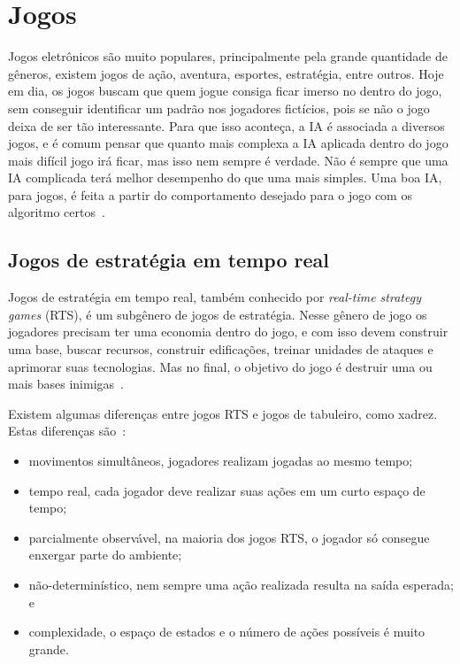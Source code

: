\chapter{\label{chap:jogos}Jogos}

Jogos eletrônicos são muito populares, principalmente pela grande quantidade de gêneros, existem jogos de ação, aventura, esportes, estratégia, entre outros. Hoje em dia, os jogos buscam que quem jogue consiga ficar imerso no dentro do jogo, sem conseguir identificar um padrão nos jogadores fictícios, pois se não o jogo deixa de ser tão interessante. Para que isso aconteça, a IA é associada a diversos jogos, e é comum pensar que quanto mais complexa a IA aplicada dentro do jogo mais difícil jogo irá ficar, mas isso nem sempre é verdade. Não é sempre que uma IA complicada terá melhor desempenho do que uma mais simples. Uma boa IA, para jogos, é feita a partir do comportamento desejado para o jogo com os algoritmo certos~\cite{millington2009artificial}.

\section{Jogos de estratégia em tempo real}

Jogos de estratégia em tempo real, também conhecido por \textit{real-time strategy games} (RTS), é um subgênero de jogos de estratégia. Nesse gênero de jogo os jogadores precisam ter uma economia dentro do jogo, e com isso devem construir uma base, buscar recursos, construir edificações, treinar unidades de ataques e aprimorar suas tecnologias. Mas no final, o objetivo do jogo é destruir uma ou mais bases inimigas~\cite{ontanon2013survey, buro2012real}. 

Existem algumas diferenças entre jogos RTS e jogos de tabuleiro, como xadrez. Estas diferenças são~\cite{ontanon2013survey}:

\begin{itemize}
	\item movimentos simultâneos, jogadores realizam jogadas ao mesmo tempo;
	\item tempo real, cada jogador deve realizar suas ações em um curto espaço de tempo;
	\item parcialmente observável, na maioria dos jogos RTS, o jogador só consegue enxergar parte do ambiente;
	\item não-determinístico, nem sempre uma ação realizada resulta na saída esperada; e
	\item complexidade, o espaço de estados e o número de ações possíveis é muito grande.
\end{itemize} 

